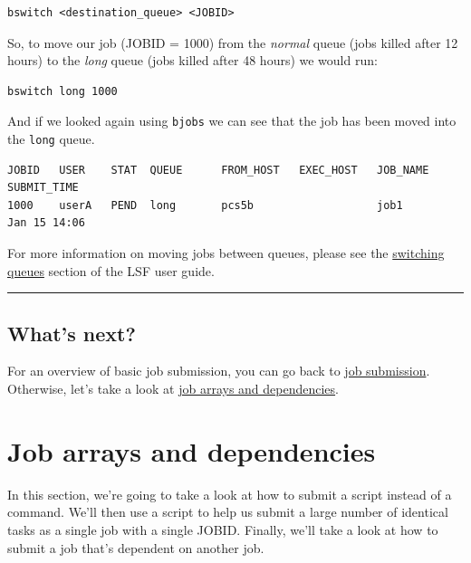 \documentclass[11pt]{article}
\begin{document}
    \begin{verbatim}
bswitch <destination_queue> <JOBID>
\end{verbatim}

    So, to move our job (JOBID = 1000) from the \textit{normal} queue (jobs
killed after 12 hours) to the \textit{long} queue (jobs killed after 48
hours) we would run:

    \begin{verbatim}
bswitch long 1000
\end{verbatim}

    And if we looked again using \texttt{bjobs} we can see that the job has
been moved into the \texttt{long} queue.

    \begin{verbatim}
JOBID   USER    STAT  QUEUE      FROM_HOST   EXEC_HOST   JOB_NAME   SUBMIT_TIME
1000    userA   PEND  long       pcs5b                   job1       Jan 15 14:06
\end{verbatim}

    For more information on moving jobs between queues, please see the
\href{https://www.ibm.com/support/knowledgecenter/SSETD4_9.1.3/lsf_admin/job_switch_queue.html}{switching
queues} section of the LSF user guide.

    \begin{center}\rule{0.5\linewidth}{\linethickness}\end{center}

    \subsection{What's next?}\label{whats-next}

For an overview of basic job submission, you can go back to
\href{job_submission.ipynb}{job submission}. Otherwise, let's take a
look at \href{job_arrays.ipynb}{job arrays and dependencies}.





\newpage






    \section{Job arrays and dependencies}\label{job-arrays-and-dependencies}

    In this section, we're going to take a look at how to submit a script
instead of a command. We'll then use a script to help us submit a large
number of identical tasks as a single job with a single JOBID. Finally,
we'll take a look at how to submit a job that's dependent on another
job.
\end{document}
